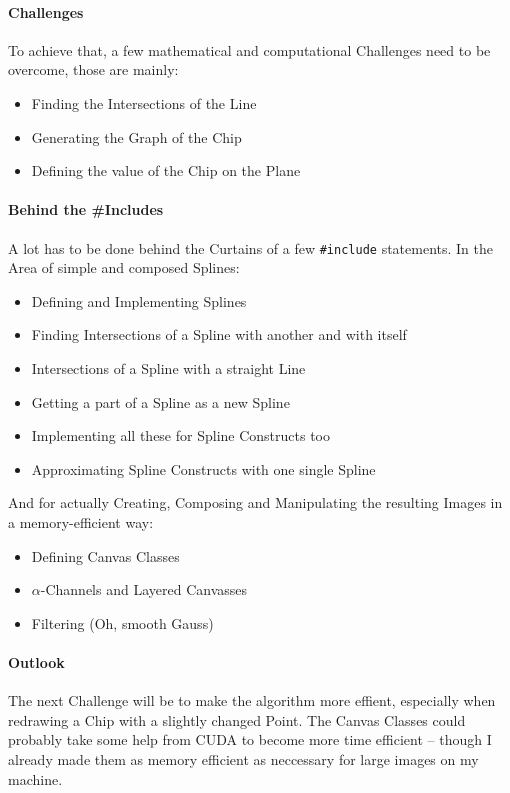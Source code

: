 \documentclass[10pt]{article}
\begin{document}
\paragraph{Challenges}
    To achieve that, a few mathematical and computational Challenges need to be overcome, those are mainly:
    \begin{itemize}
        \item Finding the Intersections of the Line
        \item Generating the Graph of the Chip
        \item Defining the value of the Chip on the Plane
    \end{itemize}
\paragraph{Behind the \#Includes}
    A lot has to be done behind the Curtains of a few {\tt \#include} statements.
    In the Area of simple and composed Splines:
    \begin{itemize}
        \item Defining and Implementing Splines
        \item Finding Intersections of a Spline with another and with itself
        \item Intersections of a Spline with a straight Line
        \item Getting a part of a Spline as a new Spline
        \item Implementing all these for Spline Constructs too
        \item Approximating Spline Constructs with one single Spline
    \end{itemize}
    And for actually Creating, Composing and Manipulating the resulting Images in a memory-efficient way:
    \begin{itemize}
        \item Defining Canvas Classes
        \item $\alpha$-Channels and Layered Canvasses
        \item Filtering (Oh, smooth Gauss)
    \end{itemize}
\paragraph{Outlook}
    The next Challenge will be to make the algorithm more effient, especially when redrawing a Chip with a slightly changed Point.
    The Canvas Classes could probably take some help from CUDA to become more time efficient – though I already made them as memory efficient as neccessary for large images on my machine.
\end{document}
